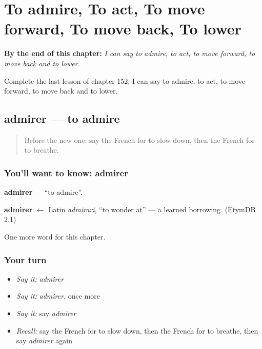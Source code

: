 
\chapter{To admire, To act, To move forward, To move back, To lower}
\label{ch:fr-to-admire-to-act-to-move-forward-to-move-back-to-lower}

\begin{chapteropening}
\textbf{By the end of this chapter:} \emph{I can say to admire, to act, to move forward, to move back and to lower.}

Complete the last lesson of chapter 152: I can say to admire, to act, to move forward, to move back and to lower.
\end{chapteropening}

\section[admirer]{admirer — to admire}

\label{lesson:FR-C152-admirer}



\begin{quote}
Before the new one: say the French for to slow down, then the French for to breathe.
\end{quote}

\subsection*{You'll want to know: admirer}
\textbf{admirer} — \textquotedblleft{}to admire\textquotedblright{}.

\begin{cousinweb}
\textbf{admirer} $\leftarrow$ Latin \emph{admirari}, \textquotedblleft{}to wonder at\textquotedblright{} — a learned borrowing. (EtymDB 2.1)
\end{cousinweb}

\begin{grammarlens}[title={What you've built}]
One more word for this chapter.
\end{grammarlens}

\subsection*{Your turn}
\begin{itemize}
\raggedright
  \item \emph{Say it:} \emph{admirer}
  \item \emph{Say it:} \emph{admirer}, once more
  \item \emph{Say it:} say \emph{admirer}
  \item \emph{Recall:} say the French for to slow down, then the French for to breathe, then say \emph{admirer} again
\end{itemize}

